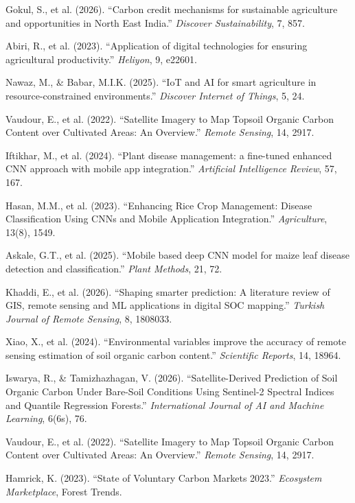 \documentclass[10pt,a4paper]{article}
\begin{document}
\noindent [3] Gokul, S., et al. (2026). ``Carbon credit mechanisms for sustainable agriculture and opportunities in North East India.'' \textit{Discover Sustainability}, 7, 857.

\noindent [4] Abiri, R., et al. (2023). ``Application of digital technologies for ensuring agricultural productivity.'' \textit{Heliyon}, 9, e22601.

\noindent [5] Nawaz, M., \& Babar, M.I.K. (2025). ``IoT and AI for smart agriculture in resource-constrained environments.'' \textit{Discover Internet of Things}, 5, 24.

\noindent [6] Vaudour, E., et al. (2022). ``Satellite Imagery to Map Topsoil Organic Carbon Content over Cultivated Areas: An Overview.'' \textit{Remote Sensing}, 14, 2917.

\noindent [7] Iftikhar, M., et al. (2024). ``Plant disease management: a fine-tuned enhanced CNN approach with mobile app integration.'' \textit{Artificial Intelligence Review}, 57, 167.

\noindent [8] Hasan, M.M., et al. (2023). ``Enhancing Rice Crop Management: Disease Classification Using CNNs and Mobile Application Integration.'' \textit{Agriculture}, 13(8), 1549.

\noindent [9] Askale, G.T., et al. (2025). ``Mobile based deep CNN model for maize leaf disease detection and classification.'' \textit{Plant Methods}, 21, 72.

\noindent [10] Khaddi, E., et al. (2026). ``Shaping smarter prediction: A literature review of GIS, remote sensing and ML applications in digital SOC mapping.'' \textit{Turkish Journal of Remote Sensing}, 8, 1808033.

\noindent [11] Xiao, X., et al. (2024). ``Environmental variables improve the accuracy of remote sensing estimation of soil organic carbon content.'' \textit{Scientific Reports}, 14, 18964.

\noindent [12] Iswarya, R., \& Tamizhazhagan, V. (2026). ``Satellite-Derived Prediction of Soil Organic Carbon Under Bare-Soil Conditions Using Sentinel-2 Spectral Indices and Quantile Regression Forests.'' \textit{International Journal of AI and Machine Learning}, 6(6s), 76.

\noindent [13] Vaudour, E., et al. (2022). ``Satellite Imagery to Map Topsoil Organic Carbon Content over Cultivated Areas: An Overview.'' \textit{Remote Sensing}, 14, 2917.

\noindent [14] Hamrick, K. (2023). ``State of Voluntary Carbon Markets 2023.'' \textit{Ecosystem Marketplace}, Forest Trends.
\end{document}

